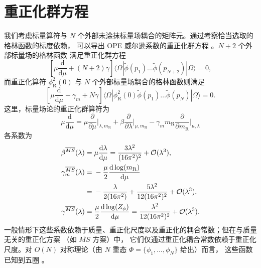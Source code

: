 \section{\label{sec:rgeqns}重正化群方程}

我们考虑标量算符与 $N$ 个外部未涂抹标量场耦合的矩阵元。通过考察恰当选取的格林函数的标度依赖，
可以导出 OPE 威尔逊系数的重正化群方程 \cite{Collins:1984rdg}。$N+2$ 个外部标量场的格林函数
满足重正化群方程
\begin{equation}\label{eq:rg1}
\left[\mu\frac{\mathrm{d}}{\mathrm{d} \mu}+\left(N+2\right)\gamma
\right]\big\langle \Omega |
\widetilde{\phi}(p_1) \ldots\widetilde{\phi}(p_{N+2}) | \Omega \big\rangle = 0,
\end{equation}
而重正化算符 $\phi_{\mathrm{R}}^2(0)$ 与 $N$ 个外部标量场耦合的格林函数则满足
\begin{equation}\label{eq:rg2}
\left[\mu\frac{\mathrm{d}}{\mathrm{d} \mu}-\gamma_m + N\gamma
\right]\big\langle \Omega |  \phi_{\mathrm{R}}^2(0)
\widetilde{\phi}(p_1) \ldots\widetilde{\phi}(p_N) | \Omega \big\rangle = 0.
\end{equation}
这里，标量场论的重正化群算符为
\begin{equation}
\mu\frac{\mathrm{d}}{\mathrm{d} \mu} = \mu\frac{\partial}{\partial
\mu}\bigg|_{\lambda,m_{\mathrm{R}}} + \beta
\frac{\partial}{\partial \lambda}\bigg|_{\mu,m_{\mathrm{R}}} - \gamma_m
m_{\mathrm{R}}\frac{\partial}{\partial m_{\mathrm{R}}}\bigg|_{\mu,\lambda}
\end{equation}
各系数为 \cite{Kleinert:2001ax}
\begin{align}
\beta^{\overline{MS}}(\lambda) = {} & \mu
\frac{\mathrm{d}\lambda}{\mathrm{d}\mu}
=\frac{3\lambda^2}{(16\pi^2)^2}+{\cal O}(\lambda^3), \\
\gamma_m^{\overline{MS}}(\lambda) = {} &
-\frac{\mu}{2}\frac{\mathrm{d}\log(m_{\mathrm{R}})}{\mathrm{d}\mu}
\nonumber \\
= {} &  -\frac{\lambda}{2(16\pi^2)}+
\frac{5\lambda^2}{12(16\pi^2)^2}+{\cal O}(\lambda^3), \label{eq:gammam}\\
\gamma^{\overline{MS}}(\lambda) = {} & \frac{\mu}{2}
\frac{\mathrm{d}\log(Z_\phi)}{\mathrm{d}\mu}
=  \frac{\lambda^2}{12(16\pi^2)^2}+{\cal O}(\lambda^3).
\end{align}
一般情形下这些系数依赖于质量、重正化尺度以及重正化的耦合常数；但在与质量无关的重正化方案
（如 $\overline{MS}$ 方案）中，
它们仅通过重正化耦合常数依赖于重正化尺度。对 $O(N)$ 对称理论（由 $N$
重态 $\Phi = \{\phi_1,\ldots,\phi_N\}$ 给出）而言，
这些函数已知到五圈 \cite{Derkachov:1997pf,Kleinert:2001ax}。

